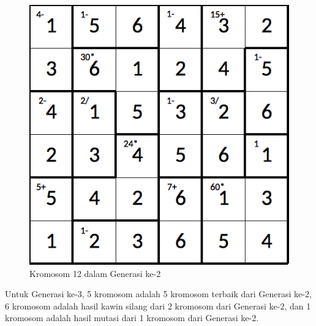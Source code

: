\begin{figure}
\centering
\captionsetup{justification=centering}
\includegraphics[scale=0.333]{Gambar/hybridgenetic/Generation2Chromosome12}
\caption[Kromosom 12 dalam Generasi ke-2]{Kromosom 12 dalam Generasi ke-2}
\label{fig:analisisg2k12}
\end{figure}

\clearpage

Untuk Generasi ke-3, 5 kromosom adalah 5 kromosom terbaik dari Generasi ke-2, 6 kromosom adalah hasil kawin silang dari 2 kromosom dari Generasi ke-2, dan 1 kromosom adalah hasil mutasi dari 1 kromosom dari Generasi ke-2.

